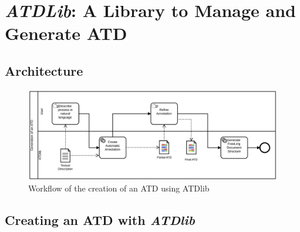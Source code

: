 \chapter{\emph{ATDLib}: A Library to Manage and Generate ATD}
\label{cha:atdlib}

\section{Architecture}

\begin{figure}[htb]
  \centering
  \includegraphics[width=\textwidth]{figures/atdlib_bpmn}
  \caption{Workflow of the creation of an ATD using ATDlib}
  \label{fig:atdlib_architecture}
\end{figure}


\section{Creating an ATD with \emph{ATDlib}}

